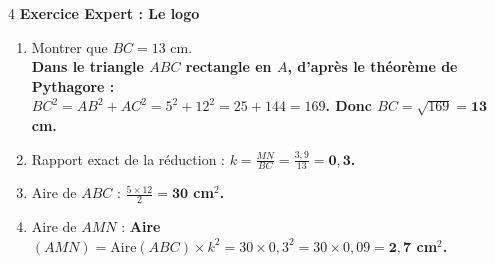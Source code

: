 \documentclass[a4paper]{book}
\begin{document}
{    \begin{exerciceNote}{4}
        \textbf{Exercice Expert : Le logo}
        \begin{enumerate}
            \item Montrer que $BC = 13$ cm. \\
            \textbf{Dans le triangle $ABC$ rectangle en $A$, d'après le théorème de Pythagore : \\
            $BC^2 = AB^2 + AC^2 = 5^2 + 12^2 = 25 + 144 = 169$. Donc $BC = \sqrt{169} = \mathbf{13}$ cm.}
            \item Rapport exact de la réduction : \textbf{$k = \frac{MN}{BC} = \frac{3,9}{13} = \mathbf{0,3}$.}
            \item Aire de $ABC$ : \textbf{$\frac{5 \times 12}{2} = \mathbf{30}$ cm$^2$.}
            \item Aire de $AMN$ : \textbf{Aire$(AMN) = \text{Aire}(ABC) \times k^2 = 30 \times 0,3^2 = 30 \times 0,09 = \mathbf{2,7}$ cm$^2$.}
        \end{enumerate}
    \end{exerciceNote}
}


\end{document}
